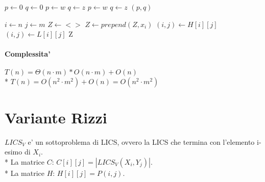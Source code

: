 \begin{algorithm}
    \begin{algorithmic}
            \State $p \gets 0$
            \State $q \gets 0$
                        \State $p \gets w$
                        \State $q \gets z$
                        \State $p \gets w$
                        \State $q \gets z$
                    \EndIf
                \EndFor
            \EndFor
            \State \Return $(p,q)$
        \EndProcedure
    \end{algorithmic}
\end{algorithm}

\begin{algorithm}
    \begin{algorithmic}
            \State $i \gets n$
            \State $j \gets m$
            \State $Z \gets <>$
                    \State $Z \gets prepend(Z, x_i)$
                    \State $(i,j) \gets H[i][j]$
                \Else
                    \State $(i,j) \gets L[i][j]$
                \EndIf
            \EndWhile
            \State \Return Z
        \EndProcedure
    \end{algorithmic}
\end{algorithm}

\paragraph{Complessita'}
$T(n) = \Theta(n \cdot m) * O(n \cdot m) + O(n)$ \\*
$T(n) = O(n^2 \cdot m^2) + O(n) = O(n^2 \cdot m^2)$

\newpage

\section{Variante Rizzi}

$LICS_V$ e' un sottoproblema di LICS, ovvero la LICS che termina con l'elemento i-esimo di $X_i$. \\*
La matrice $C$: $C[i][j] = |LICS_V(X_i, Y_j)|$. \\*
La matrice $H$: $H[i][j] = P(i, j)$. \\

